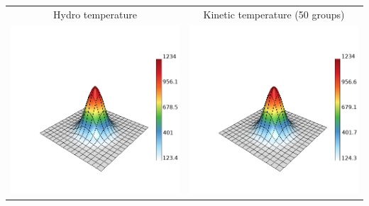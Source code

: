 \documentclass[8pt, compress]{beamer}
\begin{document}
\begin{frame}
\begin{center}
\begin{tabular}{cc}
Hydro temperature & Kinetic temperature (50 groups) \\
\includegraphics[width=\fs\textwidth]{../figures/Rect_local_Te_3D_200.png}
&
\includegraphics[width=\fs\textwidth]{../figures/Rect_local_Te_3D_50.png}
\end{tabular}
\end{center}
\end{frame}
\end{document}
